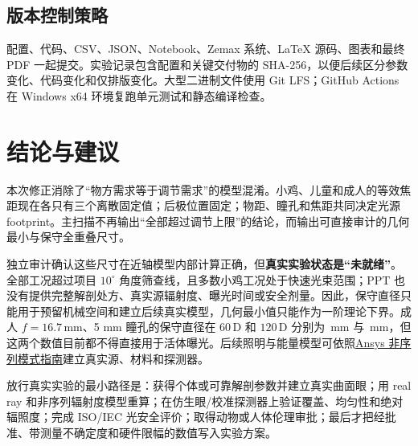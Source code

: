 \documentclass[UTF8,zihao=-4,openany,fontset=none]{ctexrep}
\newcommand{\D}{\,\mathrm{D}}
\newcommand{\mm}{\,\mathrm{mm}}
\newcommand{\keyresult}[1]{\textcolor{ReportBlue}{\textbf{#1}}}
\begin{document}
\section{版本控制策略}
配置、代码、CSV、JSON、Notebook、Zemax 系统、LaTeX 源码、图表和最终 PDF 一起提交。实验记录包含配置和关键交付物的 SHA-256，以便后续区分参数变化、代码变化和仅排版变化。大型二进制文件使用 Git LFS；GitHub Actions 在 Windows x64 环境复跑单元测试和静态编译检查。

\chapter{结论与建议}
本次修正消除了“物方需求等于调节需求”的模型混淆。小鸡、儿童和成人的等效焦距现在各只有三个离散固定值；后极位置固定；物距、瞳孔和焦距共同决定光源 footprint。主扫描不再输出“全部超过调节上限”的结论，而输出可直接审计的几何最小与保守全重叠尺寸。

独立审计确认这些尺寸在近轴模型内部计算正确，但\keyresult{真实实验状态是“未就绪”}。全部工况超过项目 $10^\circ$ 角度筛查线，且多数小鸡工况处于快速光束范围；PPT 也没有提供完整解剖处方、真实源辐射度、曝光时间或安全剂量。因此，保守直径只能用于预留机械空间和建立后续真实模型，几何最小值只能作为一阶理论下界。成人 $f=16.7\mm$、5 mm 瞳孔的保守直径在 $60\D$ 和 $120\D$ 分别为 \AdultSixtyConservative\,mm 与 \AdultOneTwentyConservative\,mm，但这两个数值目前都不得直接用于活体曝光。后续照明与能量模型可依照\href{https://optics.ansys.com/hc/en-us/articles/42661670424851-Exploring-Non-Sequential-Mode-in-OpticStudio}{Ansys 非序列模式指南}建立真实源、材料和探测器。

放行真实实验的最小路径是：获得个体或可靠解剖参数并建立真实曲面眼；用 real ray 和非序列辐射度模型重算；在仿生眼/校准探测器上验证覆盖、均匀性和绝对辐照度；完成 ISO/IEC 光安全评价；取得动物或人体伦理审批；最后才把经批准、带测量不确定度和硬件限幅的数值写入实验方案。

\appendix
\end{document}
